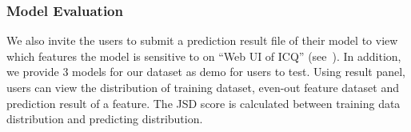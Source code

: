 \subsubsection{Model Evaluation}
We also invite the users to 
submit a prediction result file of their model to view which features the 
model is sensitive to on ``Web UI of ICQ'' (see~). 
In addition, we provide 3 models for our dataset as demo for users 
to test.  Using result panel, users can view the distribution of training dataset, 
even-out feature dataset and prediction result of a feature. The JSD score is 
calculated between training data distribution and predicting distribution.





